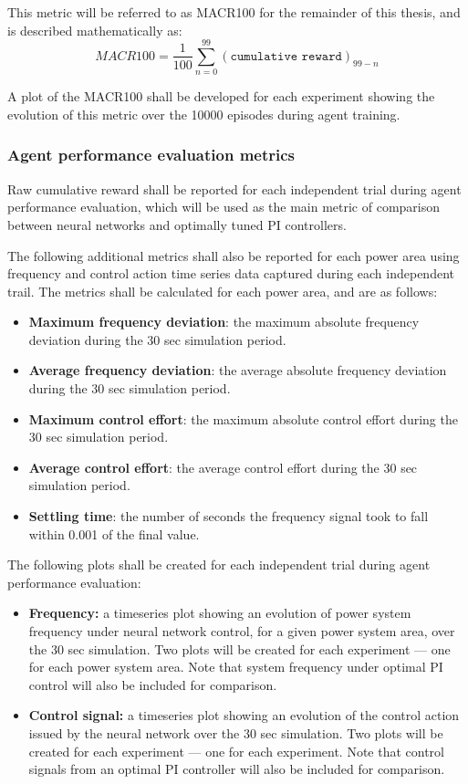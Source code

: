 This metric will be referred to as MACR100 for the remainder of this thesis, and is described mathematically as:
\begin{equation}
	MACR100 = \frac{1}{100} \sum_{n = 0}^{99} (\texttt{cumulative reward})_{99-n} 
\end{equation}

A plot of the MACR100 shall be developed for each experiment showing the evolution of this metric over the 10000 episodes during agent training.

\subsubsection{Agent performance evaluation metrics}
Raw cumulative reward shall be reported for each independent trial during agent performance evaluation, which will be used as the main metric of comparison between neural networks and optimally tuned PI controllers.

The following additional metrics shall also be reported for each power area using frequency and control action time series data captured during each independent trail. The metrics shall be calculated for each power area, and are as follows:
\begin{itemize}
	\item \textbf{Maximum frequency deviation}: the maximum absolute frequency deviation during the 30 sec simulation period.
	\item \textbf{Average frequency deviation}: the average absolute frequency deviation during the 30 sec simulation period.
	\item \textbf{Maximum control effort}: the maximum absolute control effort during the 30 sec simulation period.
	\item \textbf{Average control effort}: the average control effort during the 30 sec simulation period.
	\item \textbf{Settling time}: the number of seconds the frequency signal took to fall within 0.001 of the final value.
\end{itemize}

The following plots shall be created for each independent trial during agent performance evaluation:

\begin{itemize}
	\item \textbf{Frequency:} a timeseries plot showing an evolution of power system frequency under neural network control, for a given power system area, over the 30 sec simulation. Two plots will be created for each experiment --- one for each power system area. Note that system frequency under optimal PI control will also be included for comparison.
	\item \textbf{Control signal:} a timeseries plot showing an evolution of the control action issued by the neural network over the 30 sec simulation. Two plots will be created for each experiment --- one for each experiment. Note that control signals from an optimal PI controller will also be included for comparison.
\end{itemize}

